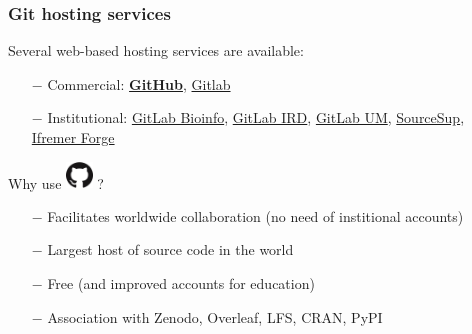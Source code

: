 \documentclass[svgnames]{beamer}
\begin{document}
\begin{frame}
\frametitle{Git hosting services}

Several web-based hosting services are available:

\begin{itemize}
\item[$-$]{Commercial: \textbf{\href{https://github.com/}{GitHub}}, \href{https://gitlab.com/}{Gitlab}}
\item[$-$]{Institutional: \href{https://gitlab-bioinfo.ird.fr/}{GitLab Bioinfo}, 
\href{https://gitlab-bioinfo.ird.fr/}{GitLab IRD},
\href{https://gitlab.mbb.univ-montp2.fr/}{GitLab UM},
\href{https://sourcesup.renater.fr/}{SourceSup},
\href{https://forge.ifremer.fr/}{Ifremer Forge}
}



\end{itemize}

Why use \includegraphics[height=20pt]{img/GitHub-Mark-120px-plus.png}  ?
\begin{itemize}
\item[$-$] Facilitates worldwide collaboration (no need of institional accounts)
\item[$-$]{Largest host of source code in the world}
\item[$-$]{Free (and improved accounts for education)}
\item[$-$]{Association with Zenodo, Overleaf, LFS, CRAN, PyPI}
\end{itemize}

\end{frame}
\end{document}
